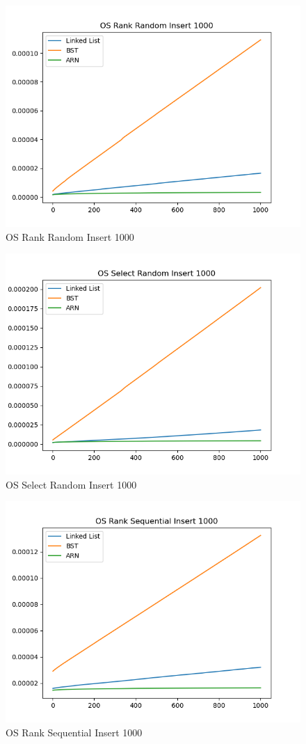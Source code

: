\documentclass[11pt]{article}
\begin{document}
 \begin{figure}[H]
  \centering
  \includegraphics[width=0.8\linewidth]{Images/1000/OS Rank Random Insert 1000.png}
  \caption{OS Rank Random Insert 1000 }
  \label{fig:OS Rank Random Insert 1000}
\end{figure}
 \begin{figure}[H]
  \centering
  \includegraphics[width=0.8\linewidth]{Images/1000/OS Select Random Insert 1000.png}
  \caption{OS Select Random Insert 1000 }
  \label{fig:OS Select Random Insert 1000}
\end{figure}
 \begin{figure}[H]
  \centering
  \includegraphics[width=0.8\linewidth]{Images/1000/OS Rank Sequential Insert 1000.png}
  \caption{OS Rank Sequential Insert 1000 }
  \label{fig:OS Rank Sequential Insert 1000}
\end{figure}
\end{document}
